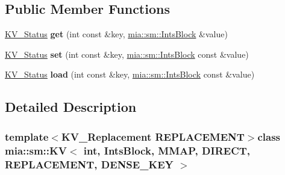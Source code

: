 \subsection*{Public Member Functions}
\begin{DoxyCompactItemize}
\item 
\hypertarget{classmia_1_1sm_1_1_k_v_3_01int_00_01_ints_block_00_01_m_m_a_p_00_01_d_i_r_e_c_t_00_01_r_e_p_l_a_e377a0951ed37be3b4316b2929369f72_a6ea29db8a8f4b0aba3158285e9df14ce}{\hyperlink{namespacemia_1_1sm_a401cbf14ccf01146eb01e3a19aa5a0dc}{K\-V\-\_\-\-Status} {\bfseries get} (int const \&key, \hyperlink{classmia_1_1sm_1_1_ints_block}{mia\-::sm\-::\-Ints\-Block} \&value)}\label{classmia_1_1sm_1_1_k_v_3_01int_00_01_ints_block_00_01_m_m_a_p_00_01_d_i_r_e_c_t_00_01_r_e_p_l_a_e377a0951ed37be3b4316b2929369f72_a6ea29db8a8f4b0aba3158285e9df14ce}

\item 
\hypertarget{classmia_1_1sm_1_1_k_v_3_01int_00_01_ints_block_00_01_m_m_a_p_00_01_d_i_r_e_c_t_00_01_r_e_p_l_a_e377a0951ed37be3b4316b2929369f72_a28a038f120bdfb0289ed951f459ed756}{\hyperlink{namespacemia_1_1sm_a401cbf14ccf01146eb01e3a19aa5a0dc}{K\-V\-\_\-\-Status} {\bfseries set} (int const \&key, \hyperlink{classmia_1_1sm_1_1_ints_block}{mia\-::sm\-::\-Ints\-Block} const \&value)}\label{classmia_1_1sm_1_1_k_v_3_01int_00_01_ints_block_00_01_m_m_a_p_00_01_d_i_r_e_c_t_00_01_r_e_p_l_a_e377a0951ed37be3b4316b2929369f72_a28a038f120bdfb0289ed951f459ed756}

\item 
\hypertarget{classmia_1_1sm_1_1_k_v_3_01int_00_01_ints_block_00_01_m_m_a_p_00_01_d_i_r_e_c_t_00_01_r_e_p_l_a_e377a0951ed37be3b4316b2929369f72_a41346cd9fbcfe4eb1de856f7222e3045}{\hyperlink{namespacemia_1_1sm_a401cbf14ccf01146eb01e3a19aa5a0dc}{K\-V\-\_\-\-Status} {\bfseries load} (int const \&key, \hyperlink{classmia_1_1sm_1_1_ints_block}{mia\-::sm\-::\-Ints\-Block} const \&value)}\label{classmia_1_1sm_1_1_k_v_3_01int_00_01_ints_block_00_01_m_m_a_p_00_01_d_i_r_e_c_t_00_01_r_e_p_l_a_e377a0951ed37be3b4316b2929369f72_a41346cd9fbcfe4eb1de856f7222e3045}

\end{DoxyCompactItemize}


\subsection{Detailed Description}
\subsubsection*{template$<$K\-V\-\_\-\-Replacement R\-E\-P\-L\-A\-C\-E\-M\-E\-N\-T$>$class mia\-::sm\-::\-K\-V$<$ int, Ints\-Block, M\-M\-A\-P, D\-I\-R\-E\-C\-T, R\-E\-P\-L\-A\-C\-E\-M\-E\-N\-T, D\-E\-N\-S\-E\-\_\-\-K\-E\-Y $>$}

